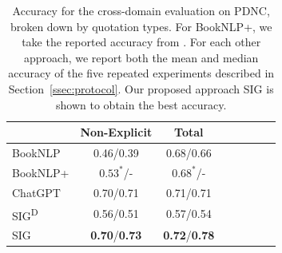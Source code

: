 \documentclass[letterpaper]{article} %
\begin{document}
\begin{table}[htbp!]

    \centering
    \begin{tabular}{l|c c c c c c c}
    \toprule
         & \bf Non-Explicit & \bf Total\\ 
       \midrule
        BookNLP  & 0.46/0.39 & 0.68/0.66 & \\
        BookNLP+ & $0.53^{*}$/-  & $0.68^{*}$/- \\
        \midrule
        ChatGPT  & 0.70/0.71 & 0.71/0.71\\
        \midrule
        SIG\textsuperscript{D} & 0.56/0.51 & 0.57/0.54\\
        SIG & \textbf{0.70}/\textbf{0.73} & \textbf{0.72}/\textbf{0.78} \\
        \bottomrule
    \end{tabular}
    \caption{Accuracy for the cross-domain evaluation on PDNC, broken down by quotation types. For BookNLP+, we take the reported accuracy from \citet{DBLP:conf/acl/VishnubhotlaRHH23}. For each other approach, we report both the mean and median accuracy of the five repeated experiments described in Section~\ref{ssec:protocol}. Our proposed approach SIG is shown to obtain the best accuracy.}
    \label{tab:cross-fiction-2}
\end{table}
\end{document}
